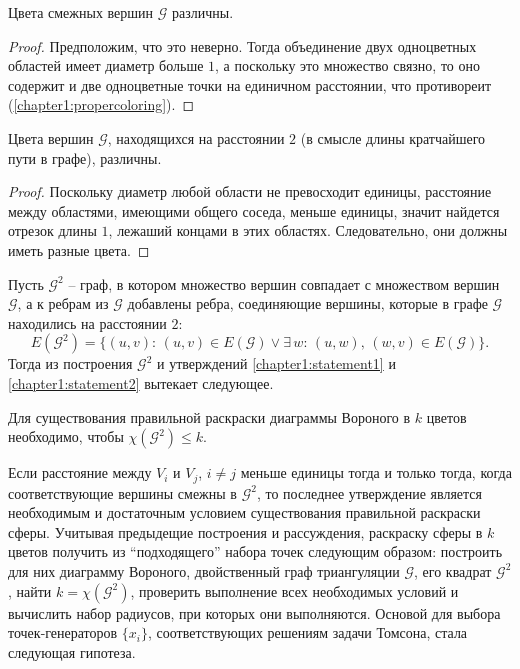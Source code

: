 \begin{statement}\label{chapter1:statement1}
Цвета смежных вершин $\mathcal{G}$ различны. 
\end{statement}

\begin{proof}
Предположим, что это неверно. Тогда объединение двух одноцветных областей имеет диаметр больше $1$, а поскольку это множество связно, то оно содержит и две одноцветные точки на единичном расстоянии, что противореит (\ref{chapter1:propercoloring}).
\end{proof}
 
\begin{statement}\label{chapter1:statement2}
Цвета вершин $\mathcal{G}$, находящихся на расстоянии $2$ (в смысле длины кратчайшего пути в графе), различны. 
\end{statement}

\begin{proof}
Поскольку диаметр любой области не превосходит единицы, расстояние между областями, имеющими общего соседа, меньше единицы,
значит найдется отрезок длины $1$, лежаший концами в этих областях. Следовательно, они должны иметь разные цвета.
\end{proof}

Пусть $\mathcal{G}^2$ -- граф, в котором множество вершин совпадает с множеством вершин $\mathcal{G}$, 
а к ребрам из $\mathcal{G}$  добавлены ребра, соединяющие вершины, 
которые в графе $\mathcal{G}$ находились на расстоянии $2$:
$$E(\mathcal{G}^2) = \{ (u,v): \, (u,v) \in E(\mathcal{G}) \lor \exists \, w: \, (u,w),\,(w,v) \in E(\mathcal{G}) \}.$$
Тогда из построения $\mathcal{G}^2$ и утверждений 
\ref{chapter1:statement1} и \ref{chapter1:statement2} вытекает следующее.

\begin{statement}
Для существования правильной раскраски диаграммы Вороного в $k$ цветов необходимо, чтобы $\chi(\mathcal{G}^2) \leq k$.
\end{statement}

Если расстояние между $V_i$ и $V_j$, $i \neq j$ меньше единицы тогда и только тогда, 
когда соответствующие вершины смежны в $\mathcal{G}^2$, то последнее утверждение является необходимым и достаточным условием существования правильной раскраски сферы. Учитывая предыдещие построения и рассуждения, 
раскраску сферы в $k$ цветов получить из \enquote{подходящего} набора точек следующим образом: 
построить для них диаграмму Вороного, двойственный граф триангуляции $\mathcal{G}$, его квадрат $\mathcal{G}^2$, 
найти $k = \chi(\mathcal{G}^2)$, проверить выполнение всех необходимых условий и вычислить набор радиусов, 
при которых они выполняются. 
Основой для выбора точек-генераторов $\{ x_i \}$, соответствующих решениям задачи Томсона, стала следующая гипотеза.

